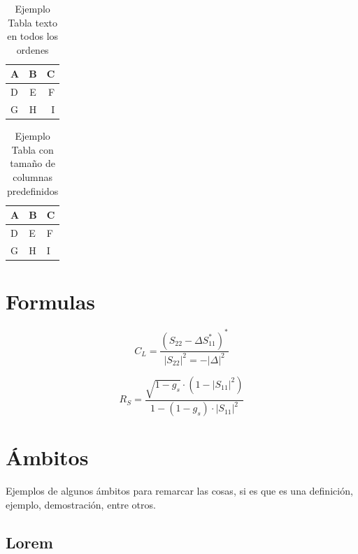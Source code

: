 \begin{table}[H]
\centering
\begin{tabular}{|l|c|r|}\hline
  A&B &C \\
  \hline
  D&E &F \\
 G & H& I\\\hline
\end{tabular}
\caption{Ejemplo Tabla texto en todos los ordenes}
\label{t:02}
\end{table}

\blindtext %

\begin{table}[H]
\centering
\begin{tabular}{|p{3cm}|p{5cm}|p{2cm}|}\hline
  A&B &C \\
  \hline
  D&E &F \\
 G & H& I\\\hline
\end{tabular}
\caption{Ejemplo Tabla con tamaño de columnas predefinidos}
\label{t:03}
\end{table}
\section{Formulas}

\blindtext %


\begin{displaymath}
C_L=\frac{(S_{22}-\Delta S_{11}^*)^*}{|S_{22}|^2=-|\Delta|^2}
\end{displaymath}
    
\begin{displaymath}
R_S=\frac{\sqrt{1-g_s}\cdot (1-|S_{11}|^2)}{1-(1-g_s)\cdot|S_{11}|^2}
\end{displaymath}


\section{Ámbitos}
Ejemplos de algunos ámbitos para remarcar las cosas, si es que es una definición, ejemplo, demostración, entre otros.
\subsection{Lorem}
\blindtext %

\begin{definir}\label{def:01}
\blindtext %
\end{definir}



